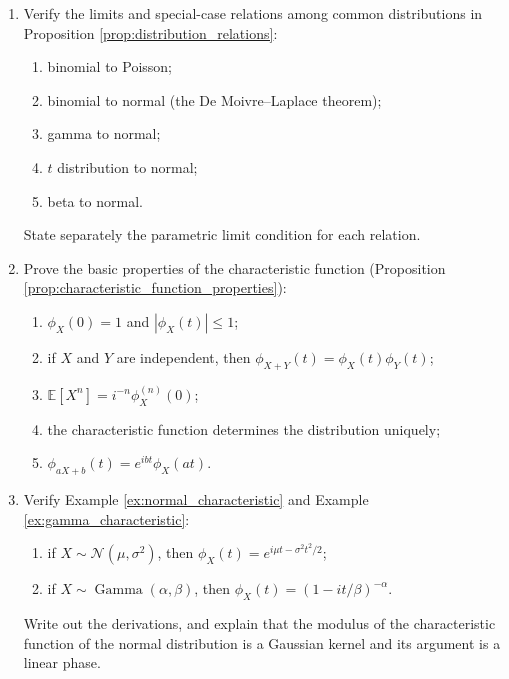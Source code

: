 \begin{enumerate}[leftmargin=3em, label=\textbf{Exercise \arabic*}]
    \item Verify the limits and special-case relations among common distributions in Proposition \ref{prop:distribution_relations}:
    \begin{enumerate}[label=(\roman*)]
        \item binomial to Poisson;
        \item binomial to normal (the De Moivre--Laplace theorem);
        \item gamma to normal;
        \item $t$ distribution to normal;
        \item beta to normal.
    \end{enumerate}
    State separately the parametric limit condition for each relation.

    \item Prove the basic properties of the characteristic function (Proposition \ref{prop:characteristic_function_properties}):
    \begin{enumerate}[label=(\roman*)]
        \item $\phi_X(0)=1$ and $|\phi_X(t)|\le1$;
        \item if $X$ and $Y$ are independent, then $\phi_{X+Y}(t)=\phi_X(t)\phi_Y(t)$;
        \item $\mathbb{E}[X^n]=i^{-n}\phi_X^{(n)}(0)$;
        \item the characteristic function determines the distribution uniquely;
        \item $\phi_{aX+b}(t)=e^{ibt}\phi_X(at)$.
    \end{enumerate}

    \item Verify Example \ref{ex:normal_characteristic} and Example \ref{ex:gamma_characteristic}:
    \begin{enumerate}[label=(\roman*)]
        \item if $X\sim\mathcal{N}(\mu,\sigma^2)$, then $\phi_X(t)=e^{i\mu t-\sigma^2t^2/2}$;
        \item if $X\sim\operatorname{Gamma}(\alpha,\beta)$, then $\phi_X(t)=(1-it/\beta)^{-\alpha}$.
    \end{enumerate}
    Write out the derivations, and explain that the modulus of the characteristic function of the normal distribution is a Gaussian kernel and its argument is a linear phase.


\end{enumerate}
